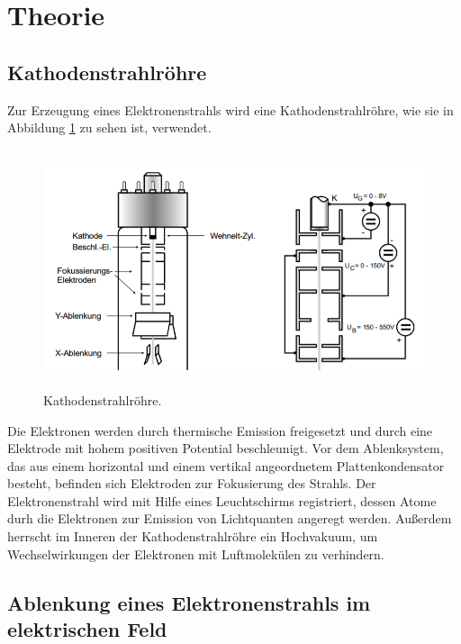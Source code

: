 \section{Theorie}
\label{sec:Theorie}

\subsection{Kathodenstrahlröhre}
\label{sec:Kathodenstrahlröhre}

Zur Erzeugung eines Elektronenstrahls wird eine Kathodenstrahlröhre, wie sie in Abbildung \ref{fig:rohr} zu sehen ist, verwendet.
\begin{figure}
  \centering
  \includegraphics[height=7cm]{data/Kathodenstrahlrohr.png}
  \caption{Kathodenstrahlröhre.}
  \label{fig:rohr}
\end{figure}
Die Elektronen werden durch thermische Emission freigesetzt und durch eine Elektrode mit hohem positiven Potential beschleunigt.
Vor dem Ablenksystem, das aus einem horizontal und einem vertikal angeordnetem Plattenkondensator besteht, befinden sich Elektroden zur Fokusierung des Strahls.
Der Elektronenstrahl wird mit Hilfe eines Leuchtschirms registriert, dessen Atome durh die Elektronen zur Emission von Lichtquanten angeregt werden.
Außerdem herrscht im Inneren der Kathodenstrahlröhre ein Hochvakuum, um Wechselwirkungen der Elektronen mit Luftmolekülen zu verhindern.

\subsection{Ablenkung eines Elektronenstrahls im elektrischen Feld}
\label{sec:elekAblenkung}

